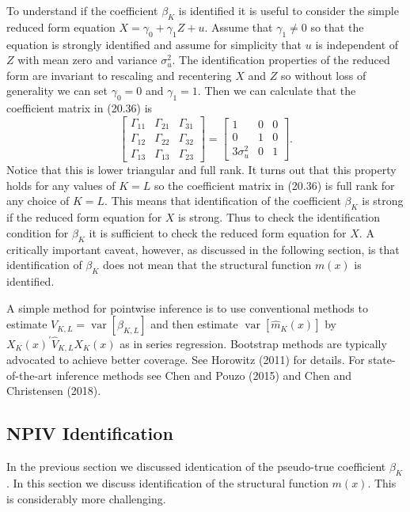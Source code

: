 \documentclass[10pt]{article}
\begin{document}
To understand if the coefficient $\beta_{K}$ is identified it is useful to consider the simple reduced form equation $X=\gamma_{0}+\gamma_{1} Z+u$. Assume that $\gamma_{1} \neq 0$ so that the equation is strongly identified and assume for simplicity that $u$ is independent of $Z$ with mean zero and variance $\sigma_{u}^{2}$. The identification properties of the reduced form are invariant to rescaling and recentering $X$ and $Z$ so without loss of generality we can set $\gamma_{0}=0$ and $\gamma_{1}=1$. Then we can calculate that the coefficient matrix in (20.36) is
$$
\left[\begin{array}{lll}
\Gamma_{11} & \Gamma_{21} & \Gamma_{31} \\
\Gamma_{12} & \Gamma_{22} & \Gamma_{32} \\
\Gamma_{13} & \Gamma_{13} & \Gamma_{23}
\end{array}\right]=\left[\begin{array}{ccc}
1 & 0 & 0 \\
0 & 1 & 0 \\
3 \sigma_{u}^{2} & 0 & 1
\end{array}\right] .
$$
Notice that this is lower triangular and full rank. It turns out that this property holds for any values of $K=L$ so the coefficient matrix in (20.36) is full rank for any choice of $K=L$. This means that identification of the coefficient $\beta_{K}$ is strong if the reduced form equation for $X$ is strong. Thus to check the identification condition for $\beta_{K}$ it is sufficient to check the reduced form equation for $X$. A critically important caveat, however, as discussed in the following section, is that identification of $\beta_{K}$ does not mean that the structural function $m(x)$ is identified.

A simple method for pointwise inference is to use conventional methods to estimate $V_{K, L}=\operatorname{var}\left[\widehat{\beta}_{K, L}\right]$ and then estimate $\operatorname{var}\left[\hat{m}_{K}(x)\right]$ by $X_{K}(x)^{\prime} \widehat{V}_{K, L} X_{K}(x)$ as in series regression. Bootstrap methods are typically advocated to achieve better coverage. See Horowitz (2011) for details. For state-of-the-art inference methods see Chen and Pouzo (2015) and Chen and Christensen (2018).

\subsection{NPIV Identification}
In the previous section we discussed identication of the pseudo-true coefficient $\beta_{K}$. In this section we discuss identification of the structural function $m(x)$. This is considerably more challenging.
\end{document}

